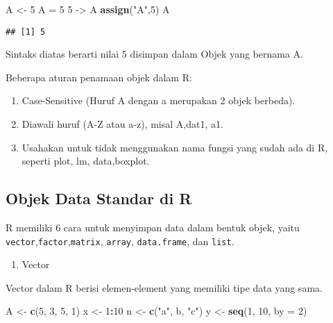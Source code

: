 \documentclass[
]{book}
\newenvironment{Shaded}{\begin{snugshade}}{\end{snugshade}}
\newcommand{\DataTypeTok}[1]{\textcolor[rgb]{0.13,0.29,0.53}{#1}}
\newcommand{\DecValTok}[1]{\textcolor[rgb]{0.00,0.00,0.81}{#1}}
\newcommand{\KeywordTok}[1]{\textcolor[rgb]{0.13,0.29,0.53}{\textbf{#1}}}
\newcommand{\NormalTok}[1]{#1}
\newcommand{\OperatorTok}[1]{\textcolor[rgb]{0.81,0.36,0.00}{\textbf{#1}}}
\newcommand{\StringTok}[1]{\textcolor[rgb]{0.31,0.60,0.02}{#1}}
\providecommand{\tightlist}{%
  \setlength{\itemsep}{0pt}\setlength{\parskip}{0pt}}
\begin{document}
\begin{Shaded}
\begin{Highlighting}[]
\NormalTok{A \textless{}{-}}\StringTok{ }\DecValTok{5}
\NormalTok{A =}\StringTok{ }\DecValTok{5}
\DecValTok{5}\NormalTok{ {-}\textgreater{}}\StringTok{ }\NormalTok{A}
\KeywordTok{assign}\NormalTok{(}\StringTok{"A"}\NormalTok{,}\DecValTok{5}\NormalTok{)}
\NormalTok{A}
\end{Highlighting}
\end{Shaded}

\begin{verbatim}
## [1] 5
\end{verbatim}

Sintaks diatas berarti nilai 5 disimpan dalam Objek yang bernama A.

Beberapa aturan penamaan objek dalam R:

\begin{enumerate}
\def\labelenumi{\alph{enumi}.}
\tightlist
\item
  Case-Sensitive (Huruf A dengan a merupakan 2 objek berbeda).
\item
  Diawali huruf (A-Z atau a-z), misal A,dat1, a1.
\item
  Usahakan untuk tidak menggunakan nama fungsi yang sudah ada di R, seperti plot, lm, data,boxplot.
\end{enumerate}

\hypertarget{objek-data-standar-di-r}{%
\subsection{Objek Data Standar di R}\label{objek-data-standar-di-r}}

R memiliki 6 cara untuk menyimpan data dalam bentuk objek, yaitu \texttt{vector},\texttt{factor},\texttt{matrix}, \texttt{array}, \texttt{data.frame}, dan \texttt{list}.

\begin{enumerate}
\def\labelenumi{\arabic{enumi}.}
\tightlist
\item
  Vector
\end{enumerate}

Vector dalam R berisi elemen-element yang memiliki tipe data yang sama.

\begin{Shaded}
\begin{Highlighting}[]
\NormalTok{A \textless{}{-}}\StringTok{ }\KeywordTok{c}\NormalTok{(}\DecValTok{5}\NormalTok{, }\DecValTok{3}\NormalTok{, }\DecValTok{5}\NormalTok{, }\DecValTok{1}\NormalTok{)}
\NormalTok{x \textless{}{-}}\StringTok{ }\DecValTok{1}\OperatorTok{:}\DecValTok{10}
\NormalTok{n \textless{}{-}}\StringTok{ }\KeywordTok{c}\NormalTok{(}\StringTok{"a"}\NormalTok{, }\StringTok{\textquotesingle{}b\textquotesingle{}}\NormalTok{, }\StringTok{"c"}\NormalTok{)}
\NormalTok{y \textless{}{-}}\StringTok{ }\KeywordTok{seq}\NormalTok{(}\DecValTok{1}\NormalTok{, }\DecValTok{10}\NormalTok{, }\DataTypeTok{by =} \DecValTok{2}\NormalTok{)}
\end{Highlighting}
\end{Shaded}
\end{document}
